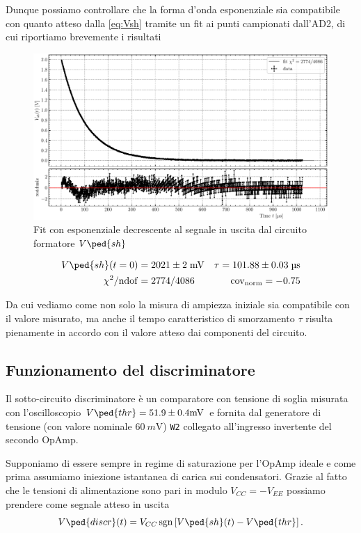 \documentclass[10pt, a4paper, italian]{article}
\begin{document}
Dunque possiamo controllare che la forma d'onda esponenziale sia compatibile
con quanto atteso dalla \eqref{eq:Vsh} tramite un fit ai punti campionati
dall'AD2, di cui riportiamo brevemente i risultati
\begin{figure}[htbp]
    \centering
	\includegraphics[scale=0.6]{tau}
    \caption{Fit con esponenziale decrescente al segnale in uscita dal
    circuito formatore $V\ped{sh}$ \label{fig: tau}}
\end{figure}
\begin{align*}
V\ped{sh} (t=0) &= 2021 \pm 2 \; \si{m\V}
&\tau = 101.88 \pm 0.03 \; \si{\micro\s} \\
\chi^2/\mathrm{ndof} &= 2774/4086 &\mathrm{cov_{norm}} = -0.75
\end{align*}

Da cui vediamo come non solo la misura di ampiezza iniziale sia compatibile
con il valore misurato, ma anche il tempo caratteristico di smorzamento $\tau$
risulta pienamente in accordo con il valore atteso dai componenti del
circuito.

\setcounter{subsection}{3}
\subsection{Funzionamento del discriminatore}\label{sub: discr}
Il sotto-circuito discriminatore è un comparatore con tensione di soglia
misurata con l'oscilloscopio $V\ped{thr} = 51.9 \pm 0.4 \si{m\V}$ e fornita
dal generatore di tensione (con valore nominale $\SI{60}{m\V}$) \verb+W2+
collegato all'ingresso invertente del secondo OpAmp.

Supponiamo di essere sempre in regime di saturazione per l'OpAmp ideale e
come prima assumiamo iniezione istantanea di carica sui condensatori. 
Grazie al fatto che le tensioni di alimentazione sono pari in modulo
$V_{CC} = - V_{EE}$ possiamo prendere come segnale atteso in uscita
\begin{equation}\label{eq: Vdiscr}
V\ped{discr} (t) = V_{CC} \sgn\left[V\ped{sh}(t) - V\ped{thr}\right].
\end{equation}
\end{document}
